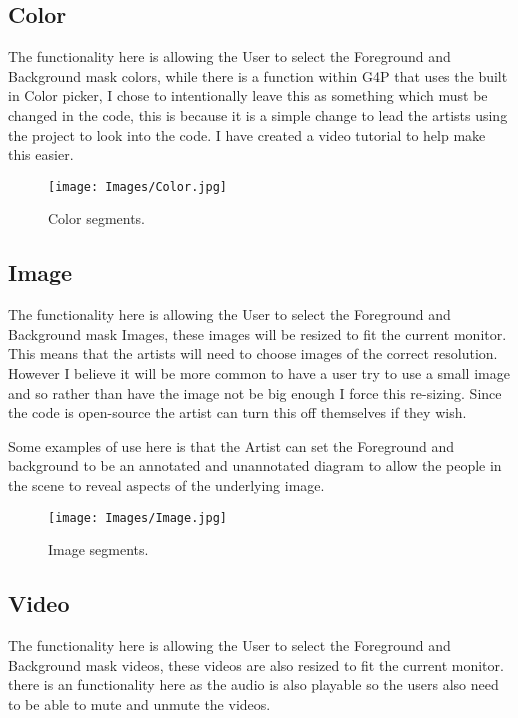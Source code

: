 \documentclass[a4paper]{report}
\begin{document}
\subsection{Color}
The functionality here is allowing the User to select the Foreground and Background mask colors, while there is a function within G4P\cite{G4P} that uses the built in Color picker, I chose to intentionally leave this as something which must be changed in the code, this is because it is a simple change to lead the artists using the project to look into the code. I have created a video tutorial to help make this easier.

\begin{figure}[!ht]
\centering
\texttt{[image: Images/Color.jpg]}
\caption{\label{fig:Doughnut} Color segments.}
\end{figure}
\clearpage

\subsection{Image}
The functionality here is allowing the User to select the Foreground and Background mask Images, these images will be resized to fit the current monitor. This means that the artists will need to choose images of the correct resolution. However I believe it will be more common to have a user try to use a small image and so rather than have the image not be big enough I force this re-sizing. Since the code is open-source the artist can turn this off themselves if they wish.

Some examples of use here is that the Artist can set the Foreground and background to be an annotated and unannotated diagram to allow the people in the scene to reveal aspects of the underlying image.

\begin{figure}[!ht]
\centering
\texttt{[image: Images/Image.jpg]}
\caption{\label{fig:Doughnut} Image segments.}
\end{figure}

\subsection{Video}
The functionality here is allowing the User to select the Foreground and Background mask videos, these videos are also resized to fit the current monitor. there is an functionality here as the audio is also playable so the users also need to be able to mute and unmute the videos.
\end{document}
